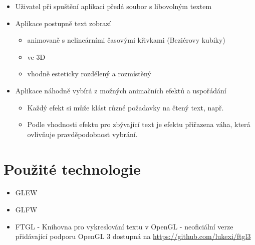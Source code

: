 \documentclass[12pt,a4paper,titlepage,final]{report}
\begin{document}
\begin{itemize}
\item Uživatel při spuštění aplikaci předá soubor s libovolným textem
\item Aplikace postupně text zobrazí
  \begin{itemize}
  \item animovaně s nelineárními časovými křivkami (Beziérovy kubiky)
  \item ve 3D
  \item vhodně esteticky rozdělený a rozmístěný
  \end{itemize}
\item Aplikace náhodně vybírá z možných animačních efektů a uspořádání
  \begin{itemize}
  \item Každý efekt si může klást různé požadavky na čtený text, např. 
  \item Podle vhodnosti efektu pro zbývající text je efektu přiřazena váha, která ovlivňuje pravděpodobnost vybrání.
  \end{itemize}
\end{itemize}



\chapter{Použité technologie}

\begin{itemize}

\item GLEW
\item GLFW
\item FTGL - Knihovna pro vykreslování textu v OpenGL - neoficiální verze přidávající podporu OpenGL 3 dostupná na \url{https://github.com/lukexi/ftgl3}
\end{itemize}

\end{document}
